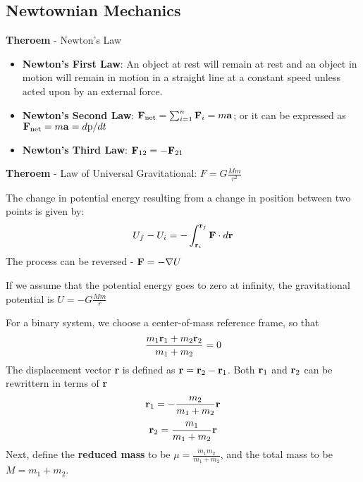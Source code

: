 \documentclass{article}
\numberwithin{equation}{section}
\numberwithin{figure}{section}
\begin{document}
	\subsection{Newtownian Mechanics}
	{\bf Theroem} - Newton's Law
	\begin{itemize}
		\item {\bf Newton's First Law}: An object at rest will remain at rest and an object in motion will remain in motion in a straight line at a constant speed unless acted upon by an external force.
		\item {\bf Newton's Second Law}: ${\bf F}_{\rm net} = \sum_{i=1}^{n}{\bf F}_i=m{\bf a}$; or it can be expressed as ${\bf F}_{\rm net} = m{\bf a} = d{\rm p}/dt$
		\item {\bf Newton's Third Law}: ${\bf F}_{\rm 12} = -{\bf F}_{\rm 21}$
	\end{itemize}
	
	{\bf Theroem} - Law of Universal Gravitational: $F=G\frac{Mm}{r^2}$
	
	The change in potential energy resulting from a change in position between two points is given by:
	\begin{equation}
		U_f - U_i = -\int_{{\bf r}_i}^{{\bf r}_j}{\bf F}\cdot d{\bf r}
	\end{equation}
	The process can be reversed - ${\bf F} = -\nabla U$
	
	If we assume that the potential energy goes to zero at infinity, the gravitational potential is $U=-G\frac{Mm}{r}$
	
	For a binary system, we choose a center-of-mass reference frame, so that
	\begin{equation}
		\frac{m_1{\bf r}_1+m_2{\bf r}_2}{m_1+m_2} = 0
	\end{equation}
	The displacement vector {\bf r} is defined as ${\bf r} = {\bf r}_2 - {\bf r}_1$. Both ${\bf r}_1$ and ${\bf r}_2$ can be rewrittern in terms of {\bf r}
	\begin{equation}
		{\bf r}_1 = -\frac{m_2}{m_1+m_2}{\bf r}
	\end{equation}
	\begin{equation}
		{\bf r}_2 = \frac{m_1}{m_1+m_2}{\bf r}
	\end{equation}
	Next, define the {\bf reduced mass} to be $\mu = \frac{m_1m_2}{m_1+m_2}$, and the total mass to be $M = m_1 + m_2$.
	
\end{document}

